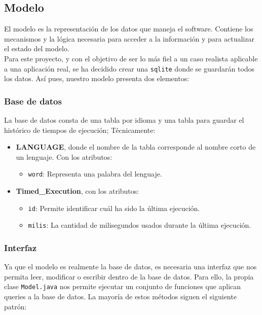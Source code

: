 \subsection{Modelo}

El modelo es la representación de los datos que maneja el software. Contiene los mecanismos y la lógica necesaria para acceder a la información y para actualizar el estado del modelo.\\

Para este proyecto, y con el objetivo de ser lo más fiel a un caso realista aplicable a una aplicación real, se ha decidido crear una \texttt{sqlite} donde se guardarán todos los datos. Así pues, nuestro modelo presenta dos elementos:

\subsubsection{Base de datos}
La base de datos consta de una tabla por idioma y una tabla para guardar el histórico de tiempos de ejecución; Técnicamente:\\

\begin{itemize}
    \item \textbf{LANGUAGE}, donde el nombre de la tabla corresponde al nombre corto de un lenguaje. Con los atributos:\begin{itemize}
        \item \texttt{word}: Representa una palabra del lenguaje.
    \end{itemize}
    \item \textbf{Timed\_Execution}, con los atributos:\begin{itemize}
        \item \texttt{id}: Permite identificar cuál ha sido la última ejecución.
        \item \texttt{milis}: La cantidad de milisegundos usados durante la última ejecución.
    \end{itemize}
\end{itemize}

\subsubsection{Interfaz}
Ya que el modelo es realmente la base de datos, es necesaria una interfaz que nos permita leer, modificar o escribir dentro de la base de datos. Para ello, la propia clase \texttt{Model.java} nos permite ejecutar un conjunto de funciones que aplican queries a la base de datos. La mayoría de estos métodos siguen el siguiente patrón:\\

